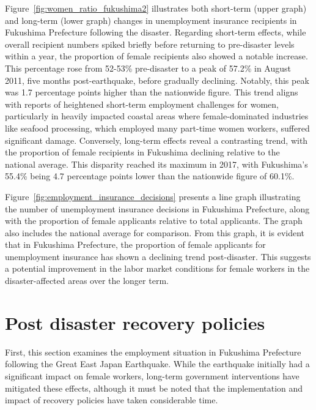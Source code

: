 \documentclass[a4paper,12pt]{article}
\begin{document}
Figure~\ref{fig:women_ratio_fukushima2} illustrates both short-term (upper graph) and long-term (lower graph) changes in unemployment insurance recipients in Fukushima Prefecture following the disaster. Regarding short-term effects, while overall recipient numbers spiked briefly before returning to pre-disaster levels within a year, the proportion of female recipients also showed a notable increase. This percentage rose from 52-53\% pre-disaster to a peak of 57.2\% in August 2011, five months post-earthquake, before gradually declining. Notably, this peak was 1.7 percentage points higher than the nationwide figure. This trend aligns with reports of heightened short-term employment challenges for women, particularly in heavily impacted coastal areas where female-dominated industries like seafood processing, which employed many part-time women workers, suffered significant damage. Conversely, long-term effects reveal a contrasting trend, with the proportion of female recipients in Fukushima declining relative to the national average. This disparity reached its maximum in 2017, with Fukushima's 55.4\% being 4.7 percentage points lower than the nationwide figure of 60.1\%.

Figure~\ref{fig:employment_insurance_decisions} presents a line graph illustrating the number of unemployment insurance decisions in Fukushima Prefecture, along with the proportion of female applicants relative to total applicants. The graph also includes the national average for comparison. From this graph, it is evident that in Fukushima Prefecture, the proportion of female applicants for unemployment insurance has shown a declining trend post-disaster. This suggests a potential improvement in the labor market conditions for female workers in the disaster-affected areas over the longer term.




\section{Post disaster recovery policies}

First, this section examines the employment situation in Fukushima Prefecture following the Great East Japan Earthquake. While the earthquake initially had a significant impact on female workers, long-term government interventions have mitigated these effects, although it must be noted that the implementation and impact of recovery policies have taken considerable time.
\end{document}

